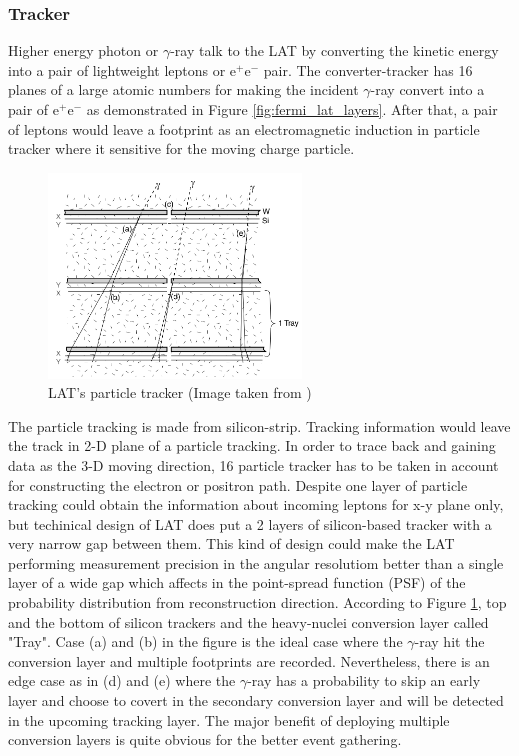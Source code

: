 \subsubsection{Tracker}
Higher energy photon or $\gamma$-ray talk to the LAT by converting the
kinetic energy into a pair of lightweight leptons or e$^{+}$e$^{-}$ pair.
The converter-tracker has 16 planes of a large atomic numbers for 
making the incident $\gamma$-ray convert into a pair of e$^{+}$e$^{-}$
as demonstrated in Figure \ref{fig:fermi_lat_layers}. After that, 
a pair of leptons would leave a footprint as an electromagnetic induction 
in particle tracker where it sensitive for the moving charge particle.

\begin{figure}[h]
    \centering
    \includegraphics[width=0.6\textwidth]{content/background/figures/fermi_tracker.png}
    \caption{LAT's particle tracker (Image taken from \cite{FermiLAT})}
    \label{fig:fermi_tracker}
\end{figure}

The particle tracking is made from silicon-strip. Tracking information 
would leave the track in 2-D plane of a particle tracking. In order to
trace back and gaining data as the 3-D moving direction, 16 particle 
tracker has to be taken in account for constructing the electron 
or positron path.
Despite one layer of particle tracking could obtain 
the information about incoming leptons for x-y plane only, but techinical 
design of LAT does put a 2 layers of silicon-based tracker with a very 
narrow gap between them. This kind of design could make the LAT performing 
measurement precision in the angular resolutiom better than a single 
layer of a wide gap which affects in the point-spread function (PSF)
of the probability distribution from reconstruction direction.
According to Figure \ref{fig:fermi_tracker}, top and the bottom of
silicon trackers and the heavy-nuclei conversion layer called "Tray".
Case (a) and (b) in the figure is the ideal case where the $\gamma$-ray
hit the conversion layer and multiple footprints are recorded.
Nevertheless, there is an edge case as in (d) and (e) where the $\gamma$-ray
has a probability to skip an early layer and choose to covert in the 
secondary conversion layer and will be detected in the upcoming 
tracking layer. The major benefit of deploying multiple conversion 
layers is quite obvious for the better event gathering.


